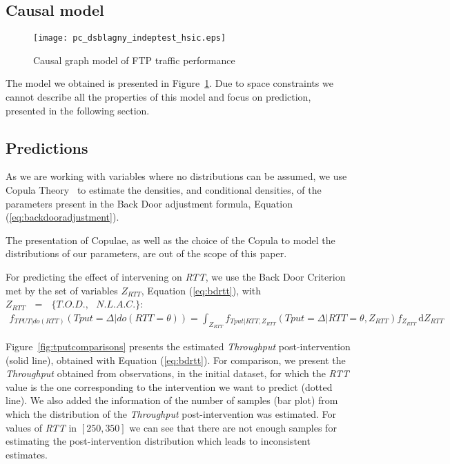 \documentclass[]{algotel}
\begin{document}
\subsection{Causal model}
\begin{figure}
 \centering
 \texttt{[image: pc\_dsblagny\_indeptest\_hsic.eps]}
 \caption{Causal graph model of FTP traffic performance}
 \label{fig:causalgraphftp}
\end{figure}

The model we obtained is presented in Figure~\ref{fig:causalgraphftp}. Due to space constraints we cannot describe all the properties of this model and focus on prediction, presented in the following section. 


\subsection{Predictions}
    As we are working with variables where no distributions can be assumed, we use Copula Theory~\cite{jaworski2010copula} to estimate the densities, and conditional densities, of the parameters present in the Back Door adjustment formula, Equation (\ref{eq:backdooradjustment}).
    
    The presentation of Copulae, as well as the choice of the Copula to model the distributions of our parameters, are out of the scope of this paper.
    
   For predicting the effect of intervening on \emph{RTT}, we use the Back Door Criterion met by the set of variables $Z_{RTT}$, Equation (\ref{eq:bdrtt}), with $Z_{RTT}\mbox{ }=\mbox{ }\{T.O.D.,\mbox{ }N.L.A.C.\}$:
   \begin{eqnarray}
      f_{TPUT|do(RTT)}(Tput = \Delta | do(RTT=\theta)) = \int_{Z_{RTT}}f_{Tput|RTT,Z_{RTT}}(Tput = \Delta | RTT = \theta, Z_{RTT})f_{Z_{RTT}} \, \mathrm{d}Z_{RTT}
      \label{eq:bdrtt}
   \end{eqnarray}
    
   Figure~\ref{fig:tputcomparisons} presents the estimated \emph{Throughput} post-intervention (solid line), obtained with Equation (\ref{eq:bdrtt}). For comparison, we present the \emph{Throughput} obtained from observations, in the initial dataset, for which the \emph{RTT} value is the one corresponding to the intervention we want to predict (dotted line). We also added the information of the number of samples (bar plot) from which the distribution of the \emph{Throughput} post-intervention was estimated. For values of \emph{RTT} in $[250,350]$ we can see that there are not enough samples for estimating the post-intervention distribution which leads to inconsistent estimates.
   
\end{document}
